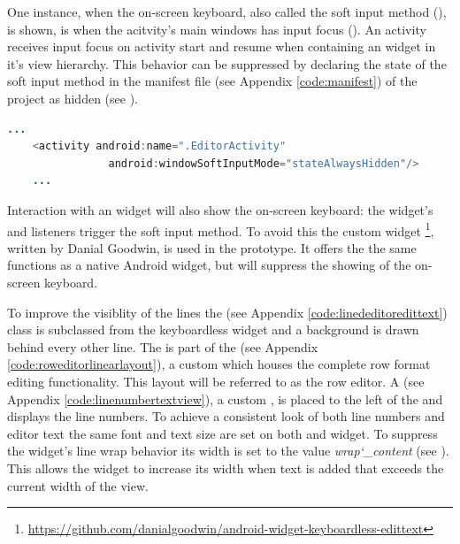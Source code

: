 One instance, when the on-screen keyboard, also called the soft input method (\cite{android_softinputmethod}), is shown, is when the acitvity's main windows has input focus (\cite{android_windowsoftinputmode_docs}). An activity receives input focus on activity start and resume when containing an  widget in it's view hierarchy. This behavior can be suppressed by declaring the state of the soft input method in the manifest file (see Appendix \ref{code:manifest}) of the project as hidden (see ).

\begin{lstlisting}[language=JAVA, caption=Declaring on-screen keyboard hidden in manifest file., label=lst:inputstate_hidden_manifest]
	...
	<activity android:name=".EditorActivity"
	            android:windowSoftInputMode="stateAlwaysHidden"/>
	...
\end{lstlisting}

Interaction with an  widget will also show the on-screen keyboard: the widget's  and  listeners trigger the soft input method. To avoid this the custom widget \footnote{\url{https://github.com/danialgoodwin/android-widget-keyboardless-edittext}}, written by Danial Goodwin, is used in the prototype. It offers the the same functions as a native Android  widget, but will suppress the showing of the on-screen keyboard.

To improve the visiblity of the lines the  (see Appendix \ref{code:linededitoredittext}) class is subclassed from the keyboardless  widget and a background is drawn behind every other line. The  is part of the  (see Appendix \ref{code:roweditorlinearlayout}), a custom  which houses the complete row format editing functionality. This layout will be referred to as the row editor. A  (see Appendix \ref{code:linenumbertextview}), a custom , is placed to the left of the  and displays the line numbers. To achieve a consistent look of both line numbers and editor text the same font and text size are set on both  and  widget.
To suppress the  widget's line wrap behavior its width is set to the value \textit{wrap\char`_content} (see ). This allows the widget to increase its width when text is added that exceeds the current width of the view.

